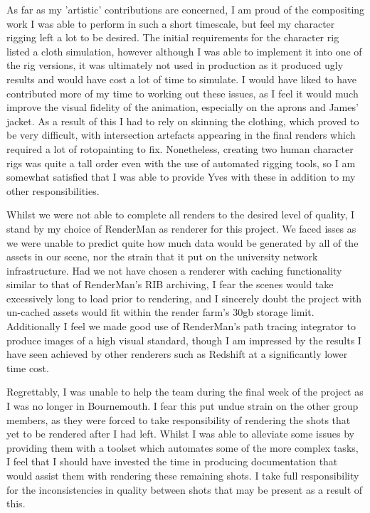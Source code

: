 \documentclass[11pt]{article}
\begin{document}
As far as my 'artistic' contributions are concerned, I am proud of the compositing work I was able to perform in such a short timescale, but feel my character rigging left a lot to be desired. The initial requirements for the character rig listed a cloth simulation, however although I was able to implement it into one of the rig versions, it was ultimately not used in production as it produced ugly results and would have cost a lot of time to simulate. I would have liked to have contributed more of my time to working out these issues, as I feel it would much improve the visual fidelity of the animation, especially on the aprons and James' jacket. As a result of this I had to rely on skinning the clothing, which proved to be very difficult, with intersection artefacts appearing in the final renders which required a lot of rotopainting to fix. Nonetheless, creating two human character rigs was quite a tall order even with the use of automated rigging tools, so I am somewhat satisfied that I was able to provide Yves with these in addition to my other responsibilities.

Whilst we were not able to complete all renders to the desired level of quality, I stand by my choice of RenderMan as renderer for this project. We faced isses as we were unable to predict quite how much data would be generated by all of the assets in our scene, nor the strain that it put on the university network infrastructure. Had we not have chosen a renderer with caching functionality similar to that of RenderMan's RIB archiving, I fear the scenes would take excessively long to load prior to rendering, and I sincerely doubt the project with un-cached assets would fit within the render farm's 30gb storage limit. Additionally I feel we made good use of RenderMan's path tracing integrator to produce images of a high visual standard, though I am impressed by the results I have seen achieved by other renderers such as Redshift at a significantly lower time cost.

Regrettably, I was unable to help the team during the final week of the project as I was no longer in Bournemouth. I fear this put undue strain on the other group members, as they were forced to take responsibility of rendering the shots that yet to be rendered after I had left. Whilst I was able to alleviate some issues by providing them with a toolset which automates some of the more complex tasks, I feel that I should have invested the time in producing documentation that would assist them with rendering these remaining shots. I take full responsibility for the inconsistencies in quality between shots that may be present as a result of this.
\end{document}
